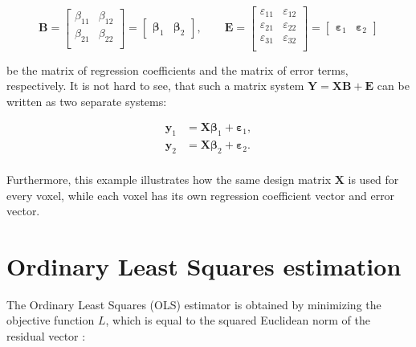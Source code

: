 \documentclass[english]{pwr_wmat_praca_dyplomowa}
\theoremstyle{definition}
\theoremstyle{remark}
\begin{document}
\begin{equation}
    \mathbf{B} = 
    \begin{bmatrix}
        \beta_{11} & \beta_{12} \\
        \beta_{21} & \beta_{22} \\
    \end{bmatrix}
    = 
    \begin{bmatrix}
        \boldsymbol{\beta}_1 & \boldsymbol{\beta}_2
    \end{bmatrix}
    , \qquad
    \mathbf{E} = 
    \begin{bmatrix}
        \varepsilon_{11} & \varepsilon_{12} \\
        \varepsilon_{21} & \varepsilon_{22} \\
        \varepsilon_{31} & \varepsilon_{32} \\
    \end{bmatrix}
    = 
    \begin{bmatrix}
        \boldsymbol{\varepsilon}_1 & \boldsymbol{\varepsilon}_2
    \end{bmatrix}
\end{equation}

be the matrix of regression coefficients and the matrix of error terms, respectively. It is not hard to see, that such a matrix system $\mathbf{Y} = \mathbf{X}\mathbf{B} + \mathbf{E}$ can be written as two separate systems:

\begin{equation}
    \begin{aligned}
        \mathbf{y}_1 &= \mathbf{X}\boldsymbol{\beta}_1 + \boldsymbol{\varepsilon}_1, \\
        \mathbf{y}_2 &= \mathbf{X}\boldsymbol{\beta}_2 + \boldsymbol{\varepsilon}_2. \\
    \end{aligned}
\end{equation}

Furthermore, this example illustrates how the same design matrix $\mathbf{X}$ is used for every voxel, while each voxel has its own regression coefficient vector and error vector.

\section{Ordinary Least Squares estimation}
\label{section:ols-estimation}

The Ordinary Least Squares (OLS) estimator is obtained by minimizing the objective function $L$, which is equal to the squared Euclidean norm of the residual vector 
\newline
\cite[Section~2.1]{agresti}:
\end{document}
